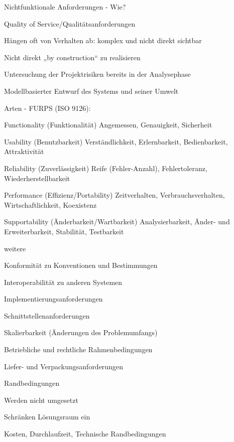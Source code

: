 \documentclass[a4paper]{article}
\begin{document}
\begin{multicols}{3}
  Nichtfunktionale Anforderungen - Wie?
  \begin{itemize*}
    \item Quality of Service/Qualitätsanforderungen
    \item Hängen oft von Verhalten ab: komplex und nicht direkt sichtbar
    \item Nicht direkt „by construction“ zu realisieren
    \item Untersuchung der Projektrisiken bereits in der Analysephase
    \item Modellbasierter Entwurf des Systems und seiner Umwelt
    \item Arten - FURPS (ISO 9126):
    \begin{description*}
      \item[Functionality] (Funktionalität) Angemessen, Genauigkeit, Sicherheit
      \item[Usability] (Benutzbarkeit) Verständlichkeit, Erlernbarkeit, Bedienbarkeit, Attraktivität
      \item[Reliability] (Zuverlässigkeit) Reife (Fehler-Anzahl), Fehlertoleranz, Wiederherstellbarkeit
      \item[Performance] (Effizienz/Portability) Zeitverhalten, Verbrauchsverhalten, Wirtschaftlichkeit, Koexistenz
      \item[Supportability] (Änderbarkeit/Wartbarkeit) Analysierbarkeit, Änder- und Erweiterbarkeit, Stabilität, Testbarkeit
    \end{description*}
    \item weitere
    \begin{itemize*}
      \item Konformität zu Konventionen und Bestimmungen
      \item Interoperabilität zu anderen Systemen
      \item Implementierungsanforderungen
      \item Schnittstellenanforderungen
      \item Skalierbarkeit (Änderungen des Problemumfangs)
      \item Betriebliche und rechtliche Rahmenbedingungen
      \item Liefer- und Verpackungsanforderungen
    \end{itemize*}
  \end{itemize*}

  Randbedingungen
  \begin{itemize*}
    \item Werden nicht umgesetzt
    \item Schränken Lösungsraum ein
    \item Kosten, Durchlaufzeit, Technische Randbedingungen
  \end{itemize*}


\end{multicols}
\end{document}
